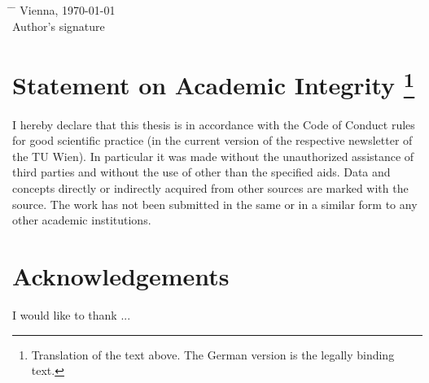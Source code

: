 \vspace{3cm}
\date{\today}
\begin{flushleft}
	\begin{tabbing}
		\hspace{5cm} \= \hspace{4.5cm} \= \hspace{4.5cm} \kill
		Vienna, \customdate\today \> \hspace{3cm} \underline{\hspace*{5cm}} \\
		\> \hspace{3cm} Author's signature \\
	\end{tabbing}
\end{flushleft}

\vspace{3cm}
	\section*{Statement on Academic Integrity \footnote{Translation of the text above. The German version is the legally binding text.}}
I hereby declare that this thesis is in accordance with the Code of Conduct rules for good scientific practice (in the current version of the respective newsletter of the TU Wien). In particular it was made without the unauthorized assistance of third parties and without the use of other than the specified aids. Data and concepts directly or indirectly acquired from other sources are marked with the source. The work has not been submitted in the same or in a similar form to any other academic institutions.
	

 

\newpage


\thispagestyle{empty} %
\null
	\section*{Acknowledgements}
	I would like to thank ...
	
\null\vfill
\newpage
